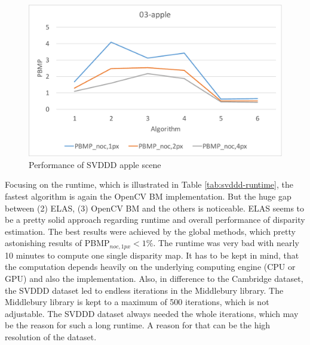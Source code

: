 \begin{figure}[h!]
\centering
\includegraphics[width=1.0\textwidth]{src/images/evaluation/svddd/03-apple-plot.pdf}
\caption[Performance of SVDDD apple scene]{Performance of SVDDD apple scene}
\label{fig:eval-svddd-plot-apple}
\end{figure}

\noindent Focusing on the runtime, which is illustrated in Table \ref{tab:svddd-runtime}, the fastest algorithm is again the OpenCV BM implementation.
But the huge gap between (2) ELAS, (3) OpenCV BM and the others is noticeable.
ELAS seems to be a pretty solid approach regarding runtime and overall performance of disparity estimation.
The best results were achieved by the global methods, which pretty astonishing results of PBMP$_{noc,1px} < 1\%$.
The runtime was very bad with nearly 10 minutes to compute one single disparity map.
It has to be kept in mind, that the computation depends heavily on the underlying computing engine (CPU or GPU) and also the implementation.
Also, in difference to the Cambridge dataset, the SVDDD dataset led to endless iterations in the Middlebury library.
The Middlebury library is kept to a maximum of 500 iterations, which is not adjustable.
The SVDDD dataset always needed the whole iterations, which may be the reason for such a long runtime.
A reason for that can be the high resolution of the dataset.

\begin{table}[h!]
\centering
{}
\caption[Result table for runtime of SVDDD]{Result table for runtime of SVDDD}
\label{tab:svddd-runtime}
\end{table}


